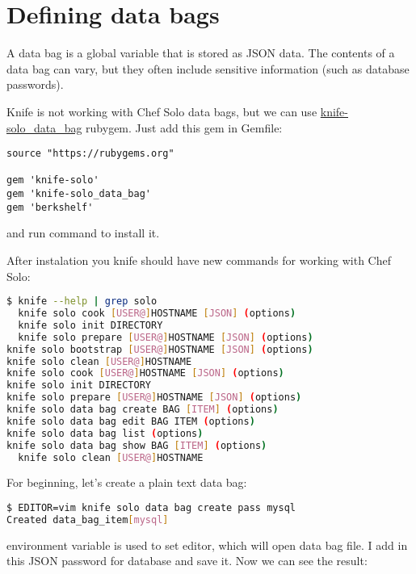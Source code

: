 \section{Defining data bags}\label{sec:solo-data-bag}

A data bag is a global variable that is stored as JSON data. The contents of a data bag can vary, but they often include sensitive information (such as database passwords).

Knife is not working with Chef Solo data bags, but we can use \href{http://thbishop.com/knife-solo\_data\_bag/}{knife-solo\_data\_bag} rubygem. Just add this gem in Gemfile:

\begin{lstlisting}[label=lst:my-cloud-chef-databag1,title=my-cloud/Gemfile]
source "https://rubygems.org"

gem 'knife-solo'
gem 'knife-solo_data_bag'
gem 'berkshelf'
\end{lstlisting}

and run command  to install it.

After instalation you knife should have new commands for working with Chef Solo:

\begin{lstlisting}[language=Bash,label=lst:my-cloud-chef-databag2]
$ knife --help | grep solo
  knife solo cook [USER@]HOSTNAME [JSON] (options)
  knife solo init DIRECTORY
  knife solo prepare [USER@]HOSTNAME [JSON] (options)
knife solo bootstrap [USER@]HOSTNAME [JSON] (options)
knife solo clean [USER@]HOSTNAME
knife solo cook [USER@]HOSTNAME [JSON] (options)
knife solo init DIRECTORY
knife solo prepare [USER@]HOSTNAME [JSON] (options)
knife solo data bag create BAG [ITEM] (options)
knife solo data bag edit BAG ITEM (options)
knife solo data bag list (options)
knife solo data bag show BAG [ITEM] (options)
  knife solo clean [USER@]HOSTNAME
\end{lstlisting}

For beginning, let's create a plain text data bag:

\begin{lstlisting}[language=Bash,label=lst:my-cloud-chef-databag3]
$ EDITOR=vim knife solo data bag create pass mysql
Created data_bag_item[mysql]
\end{lstlisting}

 environment variable is used to set editor, which will open data bag file. I add in this JSON password for database and save it. Now we can see the result:

